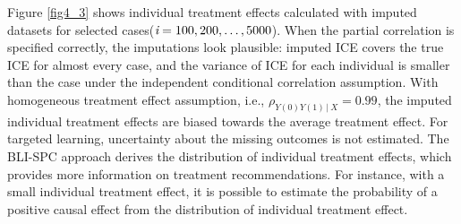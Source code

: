 	Figure \ref{fig4_3} shows individual treatment effects calculated with imputed datasets for selected cases($\emph{i} = 100, 200, \dots, 5000$). When the partial correlation is specified correctly, the imputations look plausible: imputed ICE covers the true ICE for almost every case, and the variance of ICE for each individual is smaller than the case under the independent conditional correlation assumption. With homogeneous treatment effect assumption, i.e., $\rho_{Y(0)Y(1)\,|\ X} = 0.99$, the imputed individual treatment effects are biased towards the average treatment effect. For targeted learning, uncertainty about the missing outcomes is not estimated. The BLI-SPC approach derives the distribution of individual treatment effects, which provides more information on treatment recommendations. For instance, with a small individual treatment effect, it is possible to estimate the probability of a positive causal effect from the distribution of individual treatment effect.    
	
